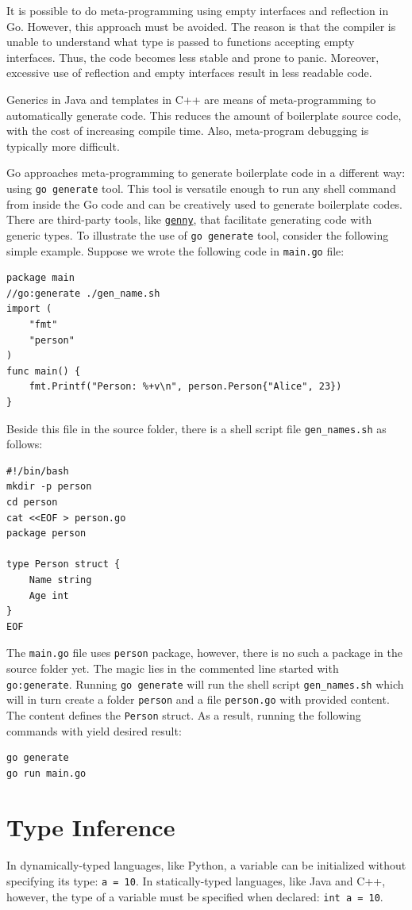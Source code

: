 \documentclass[11pt]{article}
\begin{document}
It is possible to do meta-programming using empty interfaces and reflection in Go. However, this approach must be avoided. The reason is that the compiler is unable to understand what type is passed to functions accepting empty interfaces. Thus, the code becomes less stable and prone to panic. Moreover, excessive use of reflection and empty interfaces result in less readable code.

Generics in Java and templates in C++ are means of meta-programming to automatically generate code. This reduces the amount of boilerplate source code, with the cost of increasing compile time. Also, meta-program debugging is typically more difficult.

Go approaches meta-programming to generate boilerplate code in a different way: using \texttt{go generate} tool. This tool is versatile enough to run any shell command from inside the Go code and can be creatively used to generate boilerplate codes. There are third-party tools, like \href{https://github.com/cheekybits/genny}{\texttt{genny}}, that facilitate generating code with generic types. To illustrate the use of \texttt{go generate} tool, consider the following simple example. Suppose we wrote the following code in \texttt{main.go} file:
\begin{verbatim}
package main
//go:generate ./gen_name.sh
import (
    "fmt"
    "person"
)
func main() {
    fmt.Printf("Person: %+v\n", person.Person{"Alice", 23})
}
\end{verbatim}
Beside this file in the source folder, there is a shell script file \texttt{gen\_names.sh} as follows:
\begin{verbatim}
#!/bin/bash
mkdir -p person
cd person
cat <<EOF > person.go
package person

type Person struct {
    Name string
    Age int
}
EOF
\end{verbatim}
The \texttt{main.go} file uses \texttt{person} package, however, there is no such a package in the source folder yet. The magic lies in the commented line started with \texttt{go:generate}. Running \texttt{go generate} will run the shell script \texttt{gen\_names.sh} which will in turn create a folder \texttt{person} and a file \texttt{person.go} with provided content. The content defines the \texttt{Person} struct. As a result, running the following commands with yield desired result:
\begin{verbatim}
go generate
go run main.go
\end{verbatim}

\section{Type Inference}
\label{sec:orgheadline14}
In dynamically-typed languages, like Python, a variable can be initialized without specifying its type: \texttt{a = 10}. In statically-typed languages, like Java and C++, however, the type of a variable must be specified when declared: \texttt{int a = 10}.
\end{document}
